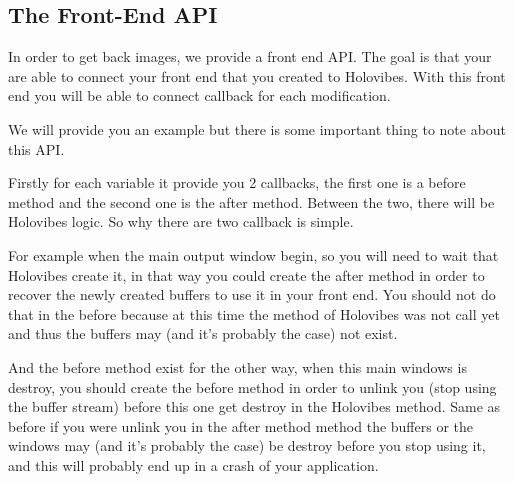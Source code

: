 
\subsection{The Front-End API}

In order to get back images, we provide a front end API. The goal is that your are able to connect your front end that you created to Holovibes.
With this front end you will be able to connect callback for each modification.

We will provide you an example but there is some important thing to note about this API.

Firstly for each variable it provide you 2 callbacks, the first one is a before method and the second one is the after method. Between the two, there will be Holovibes logic. So why there are two callback is simple.

For example when the main output window begin, so you will need to wait that Holovibes create it, in that way you could create the after method in order to recover the newly created buffers to use it in your front end. You should not do that in the before because at this time the method of Holovibes was not call yet and thus the buffers may (and it's probably the case) not exist. 

And the before method exist for the other way, when this main windows is destroy, you should create the before method in order to unlink you (stop using the buffer stream) before this one get destroy in the Holovibes method. Same as before if you were unlink you in the after method method the buffers or the windows may (and it's probably the case) be destroy before you stop using it, and this will probably end up in a crash of your application.
